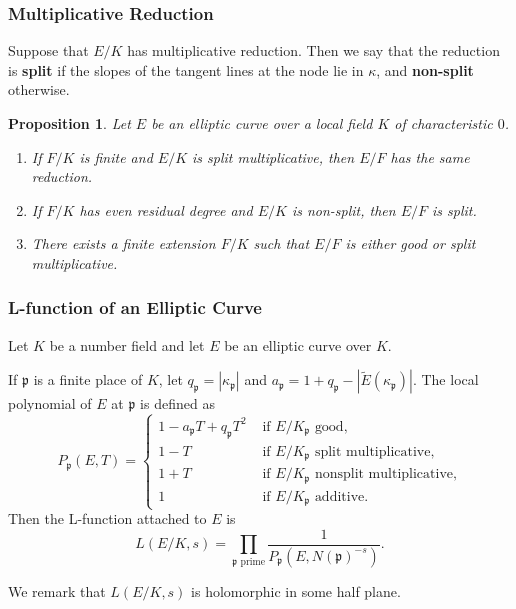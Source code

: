 \documentclass{beamer}
\newcommand{\pp}{\mathfrak{p}}
\theoremstyle{plain}
\newtheorem{proposition}[thm]{Proposition}
\begin{document}
\begin{frame}
    \frametitle{Multiplicative Reduction}
    \begin{definition}
        Suppose that $E/K$ has multiplicative reduction. Then we say that the reduction is \textbf{split} if the slopes of the tangent lines at the node lie in $\kappa$, and \textbf{non-split} otherwise.
    \end{definition}
    \begin{proposition}
        Let $E$ be an elliptic curve over a local field $K$ of characteristic $0$. 
        \begin{enumerate}
            \item If $F/K$ is finite and $E/K$ is split multiplicative, then $E/F$ has the same reduction.
            \item If $F/K$ has even residual degree and $E/K$ is non-split, then $E/F$ is split.
            \item There exists a finite extension $F/K$ such that $E/F$ is either good or split multiplicative.
        \end{enumerate}
    \end{proposition}   
\end{frame}
\fi



\begin{frame}
    \frametitle{L-function of an Elliptic Curve}
    Let $K$ be a number field and let $E$ be an elliptic curve over $K$.
    \begin{definition}
        If $\pp$ is a finite place of $K$, let $q_\pp=|\kappa_\pp|$ and $a_\pp=1+q_\pp-|\tilde{E}(\kappa_\pp)|$. The local polynomial of $E$ at $\pp$ is defined as
        \[
            P_\pp(E,T)=
            \begin{cases}
                1-a_\pp T+q_\pp T^2 &\text{ if $E/K_\pp$ good,}\\
                1-T &\text{ if $E/K_\pp$ split multiplicative,}\\
                1+T &\text{ if $E/K_\pp$ nonsplit multiplicative,}\\    
                1 &\text{ if $E/K_\pp$ additive.}
            \end{cases}
        \]
    Then the L-function attached to $E$ is 
    $$L(E/K,s)=\prod_{\pp\text{ prime}}\frac{1}{P_\pp(E,N(\pp)^{-s})}.$$
    \end{definition}
    We remark that $L(E/K,s)$ is holomorphic in some half plane.
\end{frame}
\end{document}
